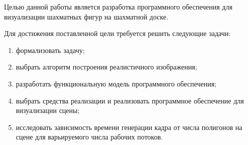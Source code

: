 
Целью данной работы является разработка программного обеспечения для визуализации шахматных фигур на шахматной доске.

Для достижения поставленной цели требуется решить следующие задачи:
\begin{enumerate}[label={\arabic*)}]
	\item формализовать задачу;
	\item выбрать алгоритм построения реалистичного изображения;
	\item разработать функциональную модель программного обеспечения;
	\item выбрать средства реализации и реализовать программное обеспечение для визуализации сцены;
	\item исследовать зависимость времени генерации кадра от числа полигонов на сцене для варьируемого числа рабочих потоков.
\end{enumerate}

\clearpage
